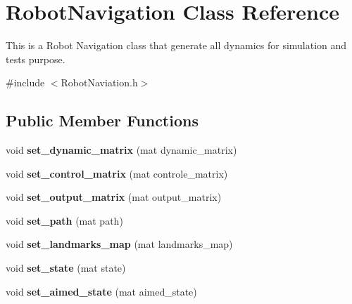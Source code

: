 \hypertarget{class_robot_navigation}{}\section{Robot\+Navigation Class Reference}
\label{class_robot_navigation}


This is a Robot Navigation class that generate all dynamics for simulation and tests purpose.  




{\ttfamily \#include $<$Robot\+Naviation.\+h$>$}

\subsection*{Public Member Functions}
\begin{DoxyCompactItemize}
\item 
\mbox{\label{class_robot_navigation_aaed78c0f698c9f29760979b654caa162}} 
void {\bfseries set\+\_\+dynamic\+\_\+matrix} (mat dynamic\+\_\+matrix)
\item 
\mbox{\label{class_robot_navigation_a3c82191207173bcd52cec1ccf7d6e16c}} 
void {\bfseries set\+\_\+control\+\_\+matrix} (mat controle\+\_\+matrix)
\item 
\mbox{\label{class_robot_navigation_a691f4f615b422d3a9dfa2e9b6a24f8e2}} 
void {\bfseries set\+\_\+output\+\_\+matrix} (mat output\+\_\+matrix)
\item 
\mbox{\label{class_robot_navigation_a02aa1b1145036f574a06384d30f7f09e}} 
void {\bfseries set\+\_\+path} (mat path)
\item 
\mbox{\label{class_robot_navigation_a498c5c0ddf8fe0c8017b19fa22a99c3d}} 
void {\bfseries set\+\_\+landmarks\+\_\+map} (mat landmarks\+\_\+map)
\item 
\mbox{\label{class_robot_navigation_a0df1fcf48da067233afaaac8456dde39}} 
void {\bfseries set\+\_\+state} (mat state)
\item 
\mbox{\label{class_robot_navigation_aadbafbe16c319df4ccb60e5c83f4af11}} 
void {\bfseries set\+\_\+aimed\+\_\+state} (mat aimed\+\_\+state)

\end{DoxyCompactItemize}
